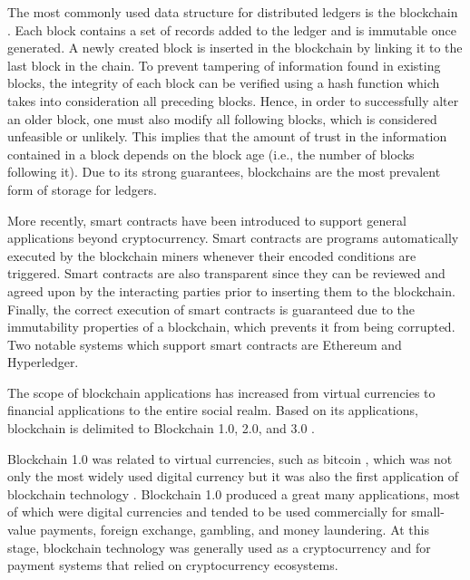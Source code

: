 The most commonly used data structure for distributed ledgers is the blockchain \cite{zhang2018towards}. Each block contains a set of records added to the ledger and is immutable once generated. A newly created block is inserted in the blockchain by linking it to the last block in the chain. To prevent tampering of information found in existing blocks, the integrity of each block can be verified using a hash function which takes into consideration all preceding blocks. Hence, in order to successfully alter an older block, one must also modify all following blocks, which is considered unfeasible or unlikely. This implies that the amount of trust in the information contained in a block depends on the block age (i.e., the number of blocks following it). Due to its strong guarantees, blockchains are the most prevalent form of storage for ledgers. 

More recently, smart contracts have been introduced to support general applications beyond cryptocurrency. Smart contracts are programs automatically executed by the blockchain miners whenever their encoded conditions are triggered. Smart contracts are also transparent since they can be reviewed and agreed upon by the interacting parties prior to inserting them to the blockchain. Finally, the correct execution of smart contracts is guaranteed due to the immutability properties of a blockchain, which prevents it from being corrupted. Two notable systems which support smart contracts are Ethereum and Hyperledger.

The scope of blockchain applications has increased from virtual currencies to financial applications to the entire social realm. Based on its applications, blockchain is delimited to Blockchain 1.0, 2.0, and 3.0 \cite{xu2019systematic}. \newline

Blockchain 1.0 was related to virtual currencies, such as bitcoin \cite{bitcoin}, which was not only the most widely used digital currency but it was also the first application of blockchain technology \cite{mainelli2015sharing}. Blockchain 1.0 produced a great many applications, most of which were digital currencies and tended to be used commercially for small-value payments, foreign exchange, gambling, and money laundering. At this stage, blockchain technology was generally used as a cryptocurrency and for payment systems that relied on cryptocurrency ecosystems. \newline

